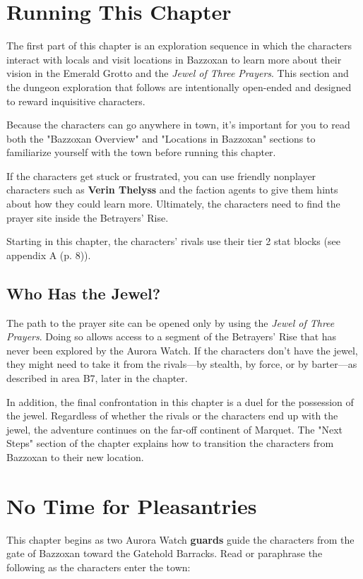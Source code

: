 \documentclass[a4paper, 11pt, bg=full, twocolumn, nooutline]{dndbook}
\begin{document}
\section{Running This Chapter}

The first part of this chapter is an exploration sequence in which the characters interact with locals and visit locations in Bazzoxan to learn more about their vision in the Emerald Grotto and the \textit{Jewel of Three Prayers}. This section and the dungeon exploration that follows are intentionally open-ended and designed to reward inquisitive characters.

Because the characters can go anywhere in town, it's important for you to read both the "Bazzoxan Overview" and "Locations in Bazzoxan" sections to familiarize yourself with the town before running this chapter.

If the characters get stuck or frustrated, you can use friendly nonplayer characters such as \textbf{Verin Thelyss} and the faction agents to give them hints about how they could learn more. Ultimately, the characters need to find the prayer site inside the Betrayers' Rise.

Starting in this chapter, the characters' rivals use their tier 2 stat blocks (see appendix A (p. 8)).

\subsection{Who Has the Jewel?}

The path to the prayer site can be opened only by using the \textit{Jewel of Three Prayers}. Doing so allows access to a segment of the Betrayers' Rise that has never been explored by the Aurora Watch. If the characters don't have the jewel, they might need to take it from the rivals---by stealth, by force, or by barter---as described in area B7, later in the chapter.

In addition, the final confrontation in this chapter is a duel for the possession of the jewel. Regardless of whether the rivals or the characters end up with the jewel, the adventure continues on the far-off continent of Marquet. The "Next Steps" section of the chapter explains how to transition the characters from Bazzoxan to their new location.
\section{No Time for Pleasantries}

This chapter begins as two Aurora Watch \textbf{guards} guide the characters from the gate of Bazzoxan toward the Gatehold Barracks. Read or paraphrase the following as the characters enter the town:
\end{document}
